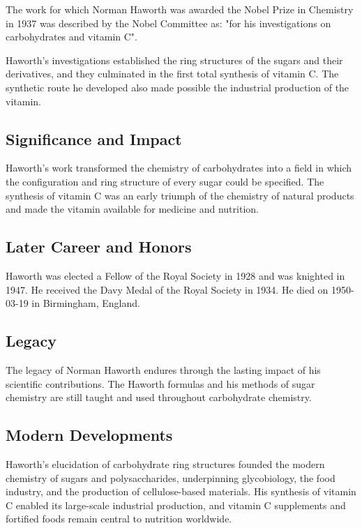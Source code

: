 The work for which Norman Haworth was awarded the Nobel Prize in Chemistry in 1937 was described by the Nobel Committee as: "for his investigations on carbohydrates and vitamin C".

Haworth's investigations established the ring structures of the sugars and their derivatives, and they culminated in the first total synthesis of vitamin C.
The synthetic route he developed also made possible the industrial production of the vitamin.

\subsection*{Significance and Impact}

Haworth's work transformed the chemistry of carbohydrates into a field in which the configuration and ring structure of every sugar could be specified.
The synthesis of vitamin C was an early triumph of the chemistry of natural products and made the vitamin available for medicine and nutrition.

\subsection*{Later Career and Honors}

Haworth was elected a Fellow of the Royal Society in 1928 and was knighted in 1947.
He received the Davy Medal of the Royal Society in 1934.
He died on 1950-03-19 in Birmingham, England.

\subsection*{Legacy}

The legacy of Norman Haworth endures through the lasting impact of his scientific contributions.
The Haworth formulas and his methods of sugar chemistry are still taught and used throughout carbohydrate chemistry.

\subsection*{Modern Developments}

Haworth's elucidation of carbohydrate ring structures founded the modern chemistry of sugars and polysaccharides, underpinning glycobiology, the food industry, and the production of cellulose-based materials. His synthesis of vitamin C enabled its large-scale industrial production, and vitamin C supplements and fortified foods remain central to nutrition worldwide.

